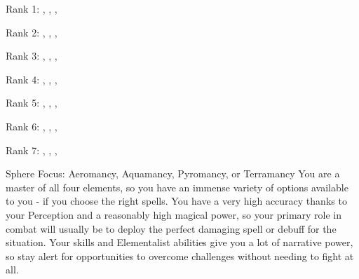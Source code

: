             \begin{raggeditemize}
                \RaggedRight
                \item Rank 1: , , , 
                \item Rank 2: , , , 
                \item Rank 3: , , , 
                \item Rank 4: , , , 
                \item Rank 5: , , , 
                \item Rank 6: , , , 
                \item Rank 7: , , , 
            \end{raggeditemize}
             Sphere Focus: Aeromancy, Aquamancy, Pyromancy, or Terramancy
             You are a master of all four elements, so you have an immense variety of options available to you - if you choose the right spells.
            You have a very high accuracy thanks to your Perception and a reasonably high magical power, so your primary role in combat will usually be to deploy the perfect damaging spell or debuff for the situation.
            Your skills and Elementalist abilities give you a lot of narrative power, so stay alert for opportunities to overcome challenges without needing to fight at all.

